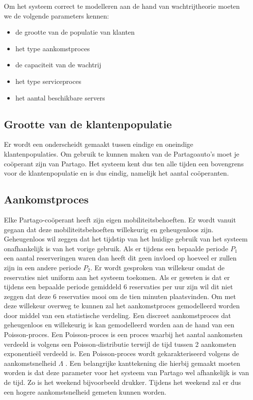 Om het systeem correct te modelleren aan de hand van wachtrijtheorie moeten we de volgende parameters kennen:
\begin{itemize}
	\item de grootte van de populatie van klanten
	\item het type aankomstproces 
	\item de capaciteit van de wachtrij
	\item het type serviceproces
	\item het aantal beschikbare servers
\end{itemize}

\subsection{Grootte van de klantenpopulatie}
Er wordt een onderscheidt gemaakt tussen eindige en oneindige klantenpopulaties. Om gebruik te kunnen maken van de Partagoauto's moet je coöperant zijn van Partago. Het systeem kent dus ten alle tijden een bovengrens voor de klantenpopulatie en is dus eindig, namelijk het aantal coöperanten.

\subsection{Aankomstproces}
Elke Partago-coöperant heeft zijn eigen mobiliteitsbehoeften. Er wordt vanuit gegaan dat deze mobiliteitsbehoeften willekeurig en geheugenloos zijn. Geheugenloos wil zeggen dat het tijdstip van het huidige gebruik van het systeem onafhankelijk is van het vorige gebruik. Als er tijdens een bepaalde periode  $P_{1}$ een aantal reserveringen waren dan heeft dit geen invloed op hoeveel er zullen zijn in een andere periode $P_{2}$. Er wordt gesproken van willekeur omdat de reservaties niet uniform aan het systeem toekomen. Als er geweten is dat er tijdens een bepaalde periode gemiddeld 6 reservaties per uur zijn wil dit niet zeggen dat deze 6 reservaties mooi om de tien minuten plaatsvinden. Om met deze willekeur overweg te kunnen zal het aankomstproces gemodelleerd worden door middel van een statistische verdeling. Een discreet aankomstproces dat geheugenloos en willekeurig is kan gemodelleerd worden aan de hand van een Poisson-proces. Een Poisson-proces is een proces waarbij het aantal aankomsten verdeeld is volgens een Poisson-distributie terwijl de tijd tussen 2 aankomsten exponentieël verdeeld is. Een Poisson-proces wordt gekarakteriseerd volgens de aankomstsnelheid $\Lambda$ \autocite{liu}. Een belangrijke kanttekening die  hierbij gemaakt moeten worden is dat deze parameter voor het systeem van Partago wel afhankelijk is van de tijd. Zo is het weekend bijvoorbeeld drukker. Tijdens het weekend zal er dus een hogere aankomstsnelheid gemeten kunnen worden. \autocite{van-buggenhout}

